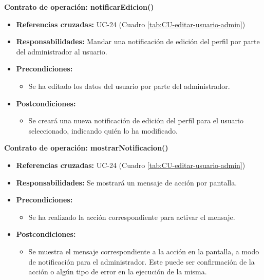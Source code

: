 \textbf{Contrato de operación: notificarEdicion()}
\begin{itemize}
\item \textbf{Referencias cruzadas:} UC-24 (Cuadro \ref{tab:CU-editar-usuario-admin})
\item \textbf{Responsabilidades:} Mandar una notificación de edición del perfil por parte del administrador al usuario.
\item \textbf{Precondiciones:} 
 \begin{itemize}
\item Se ha editado los datos del usuario por parte del administrador.
\end {itemize}
\item \textbf{Postcondiciones:} 
 \begin{itemize}
\item Se creará una nueva notificación de edición del perfil para el usuario seleccionado, indicando quién lo ha modificado.
\end {itemize}
\end {itemize}

\textbf{Contrato de operación: mostrarNotificacion()}
\begin{itemize}
\item \textbf{Referencias cruzadas:} UC-24 (Cuadro \ref{tab:CU-editar-usuario-admin})
\item \textbf{Responsabilidades:} Se mostrará un mensaje de acción por pantalla.
\item \textbf{Precondiciones:} 
 \begin{itemize}
\item Se ha realizado la acción correspondiente para activar el mensaje.
\end {itemize}
\item \textbf{Postcondiciones:} 
 \begin{itemize}
\item Se muestra el mensaje correspondiente a la acción en la pantalla, a modo de notificación para el administrador. Este puede ser confirmación de la acción o algún tipo de error en la ejecución de la misma.
\end {itemize}
\end {itemize}


\vspace{7mm}
\dotfill
\vspace{7mm}

